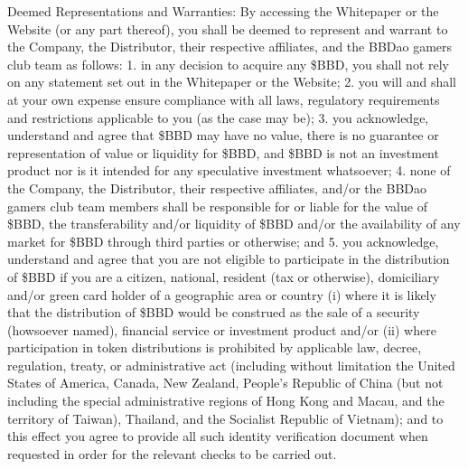 \documentclass[
]{book}
\begin{document}
Deemed Representations and Warranties: By accessing the Whitepaper or the Website (or any part thereof), you shall be deemed to represent and warrant to the Company, the Distributor, their respective affiliates, and the BBDao gamers club team as follows:
1. in any decision to acquire any \$BBD, you shall not rely on any statement set out in the Whitepaper or the Website;
2. you will and shall at your own expense ensure compliance with all laws, regulatory requirements and restrictions applicable to you (as the case may be);
3. you acknowledge, understand and agree that \$BBD may have no value, there is no guarantee or representation of value or liquidity for \$BBD, and \$BBD is not an investment product nor is it intended for any speculative investment whatsoever;
4. none of the Company, the Distributor, their respective affiliates, and/or the BBDao gamers club team members shall be responsible for or liable for the value of \$BBD, the transferability and/or liquidity of \$BBD and/or the availability of any market for \$BBD through third parties or otherwise; and
5. you acknowledge, understand and agree that you are not eligible to participate in the distribution of \$BBD if you are a citizen, national, resident (tax or otherwise), domiciliary and/or green card holder of a geographic area or country (i) where it is likely that the distribution of \$BBD would be construed as the sale of a security (howsoever named), financial service or investment product and/or (ii) where participation in token distributions is prohibited by applicable law, decree, regulation, treaty, or administrative act (including without limitation the United States of America, Canada, New Zealand, People's Republic of China (but not including the special administrative regions of Hong Kong and Macau, and the territory of Taiwan), Thailand, and the Socialist Republic of Vietnam); and to this effect you agree to provide all such identity verification document when requested in order for the relevant checks to be carried out.
\end{document}
